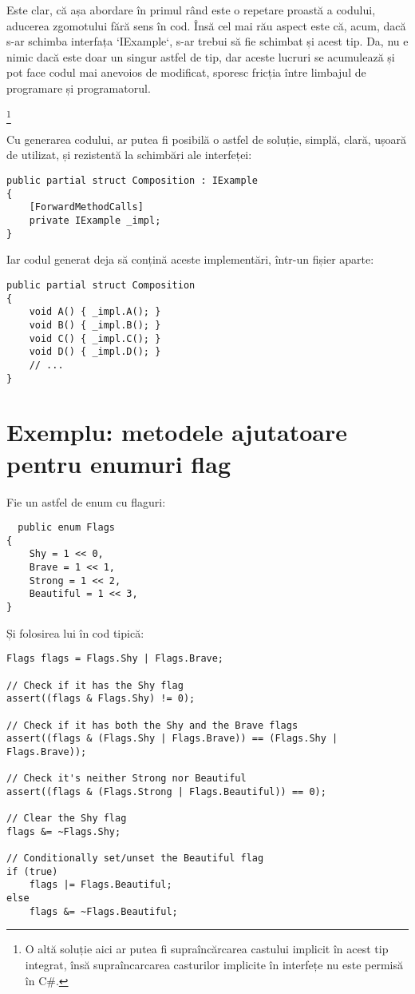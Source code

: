 \documentclass{report}
\begin{document}
Este clar, că așa abordare în primul rând este o repetare proastă a codului, aducerea zgomotului fără sens în cod.
Însă cel mai rău aspect este că, acum, dacă s-ar schimba interfața `IExample`, s-ar trebui să fie schimbat și acest tip. 
Da, nu e nimic dacă este doar un singur astfel de tip, dar aceste lucruri se acumulează și pot face codul mai anevoios de modificat, sporesc fricția între limbajul de programare și programatorul.

\footnote{
  O altă soluție aici ar putea fi supraîncărcarea castului implicit în acest tip integrat,
  însă supraîncarcarea casturilor implicite în interfețe nu este permisă în C#.
}

Cu generarea codului, ar putea fi posibilă o astfel de soluție, simplă, clară, ușoară de utilizat, și rezistentă la schimbări ale interfeței:

\begin{lstlisting}
public partial struct Composition : IExample
{
    [ForwardMethodCalls]
    private IExample _impl;
}
\end{lstlisting}

Iar codul generat deja să conțină aceste implementări, într-un fișier aparte:

\begin{lstlisting}
public partial struct Composition
{
    void A() { _impl.A(); }
    void B() { _impl.B(); }
    void C() { _impl.C(); }
    void D() { _impl.D(); }
    // ...
}
\end{lstlisting}


\section{Exemplu: metodele ajutatoare pentru enumuri flag}

Fie un astfel de enum cu flaguri:

\begin{lstlisting}
  public enum Flags
{
    Shy = 1 << 0,
    Brave = 1 << 1,
    Strong = 1 << 2,
    Beautiful = 1 << 3,
}
\end{lstlisting}

Și folosirea lui în cod tipică:

\begin{lstlisting}
Flags flags = Flags.Shy | Flags.Brave;

// Check if it has the Shy flag
assert((flags & Flags.Shy) != 0);

// Check if it has both the Shy and the Brave flags
assert((flags & (Flags.Shy | Flags.Brave)) == (Flags.Shy | Flags.Brave));

// Check it's neither Strong nor Beautiful
assert((flags & (Flags.Strong | Flags.Beautiful)) == 0);

// Clear the Shy flag
flags &= ~Flags.Shy;

// Conditionally set/unset the Beautiful flag
if (true)
    flags |= Flags.Beautiful;
else
    flags &= ~Flags.Beautiful;
\end{lstlisting}
\end{document}
